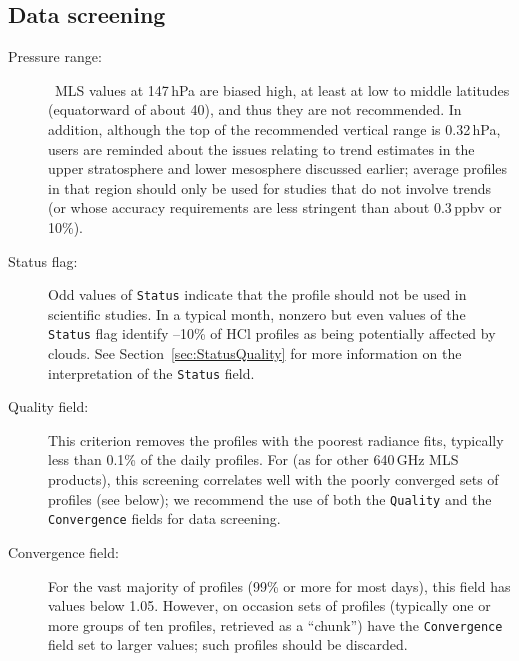 \begin{nofloatpages}
\subsection{Data screening}
\label{sec:HClScreening}
\begin{description}
  \item[Pressure range:]  \standardrangestatement\ MLS  values at 147\,hPa are biased high, at least at low to middle latitudes (equatorward of about 40\degsym), and thus they are not recommended. In addition, although the top of the recommended vertical range is 0.32\,hPa, users are reminded about the issues relating to  trend estimates in the upper stratosphere and lower mesosphere discussed earlier; average profiles in that region should only be used for studies that do not involve trends (or whose accuracy requirements are less stringent than about 0.3\,ppbv or 10\%).

  \standardprecisionrule
    
  \item[Status flag:] 

  Odd values of \texttt{Status} indicate that the profile should not be used in scientific studies. In a typical month, nonzero but even values of the \texttt{Status} flag identify --10\% of HCl profiles as being potentially affected by clouds. See Section~\ref{sec:StatusQuality} for more information on the interpretation of the \texttt{Status} field.

  \item[Quality field:]  This criterion removes the profiles with the poorest radiance fits, typically less than 0.1\% of the daily profiles. For  (as for other 640\,GHz MLS products), this screening correlates well with the poorly converged sets of profiles (see below); we recommend the use of both the \texttt{Quality} and the \texttt{Convergence} fields for data screening.

  \item[Convergence field:] 
  For the vast majority of profiles (99\% or more for most days), this field has values below 1.05. However, on occasion sets of profiles (typically one or more groups of ten profiles, retrieved as a ``chunk'') have the \texttt{Convergence} field set to larger values; such profiles should be discarded.


\end{description}
\end{nofloatpages}
